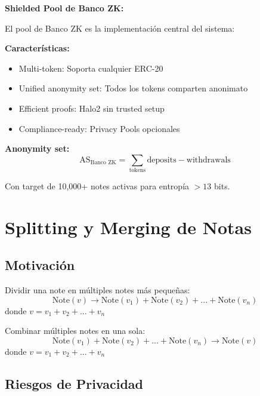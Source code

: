 \documentclass[11pt,a4paper,twoside]{book}
\begin{document}
\begin{bancozk}
\textbf{Shielded Pool de Banco ZK:}

El pool de Banco ZK es la implementaci\'on central del sistema:

\textbf{Caracter\'isticas:}
\begin{itemize}
    \item Multi-token: Soporta cualquier ERC-20
    \item Unified anonymity set: Todos los tokens comparten anonimato
    \item Efficient proofs: Halo2 sin trusted setup
    \item Compliance-ready: Privacy Pools opcionales
\end{itemize}

\textbf{Anonymity set:}
\[
\text{AS}_{\text{Banco ZK}} = \sum_{\text{tokens}} \text{deposits} - \text{withdrawals}
\]

Con target de 10,000+ notes activas para entrop\'ia $> 13$ bits.
\end{bancozk}

\section{Splitting y Merging de Notas}
\label{sec:split-merge}

\subsection{Motivaci\'on}

\begin{definition}
Dividir una note en m\'ultiples notes m\'as peque\~nas:
\[
\text{Note}(v) \to \text{Note}(v_1) + \text{Note}(v_2) + ... + \text{Note}(v_n)
\]
donde $v = v_1 + v_2 + ... + v_n$
\end{definition}

\begin{definition}
Combinar m\'ultiples notes en una sola:
\[
\text{Note}(v_1) + \text{Note}(v_2) + ... + \text{Note}(v_n) \to \text{Note}(v)
\]
donde $v = v_1 + v_2 + ... + v_n$
\end{definition}

\subsection{Riesgos de Privacidad}
\end{document}
